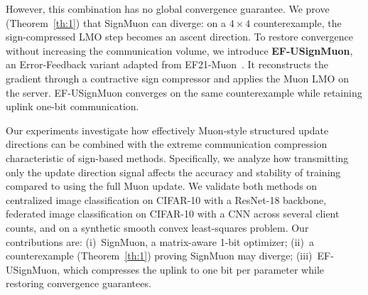 \documentclass{article}
\begin{document}
However, this combination has no global convergence guarantee. We prove (Theorem~\ref{th:1}) that SignMuon can diverge: on a $4\times4$ counterexample, the sign-compressed LMO step becomes an ascent direction. To restore convergence without increasing the communication volume, we introduce \textbf{EF-USignMuon}, an Error-Feedback variant adapted from EF21-Muon~\citet{gruntkowska2025error}. It reconstructs the gradient through a contractive sign compressor and applies the Muon LMO on the server. EF-USignMuon converges on the same counterexample while retaining uplink one-bit communication.

Our experiments investigate how effectively Muon-style structured update directions can be combined with the extreme communication compression characteristic of sign-based methods. Specifically, we analyze how transmitting only the update direction signal affects the accuracy and stability of training compared to using the full Muon update. We validate both methods on centralized image classification on CIFAR-10 with a ResNet-18 backbone, federated image classification on CIFAR-10 with a CNN across several client counts, and on a synthetic smooth convex least-squares problem. Our contributions are:
(i)~SignMuon, a matrix-aware 1-bit optimizer; 
(ii)~a counterexample (Theorem~\ref{th:1}) proving SignMuon may diverge;
(iii)~EF-USignMuon, which compresses the uplink to one bit per parameter while restoring convergence guarantees.
\end{document}
